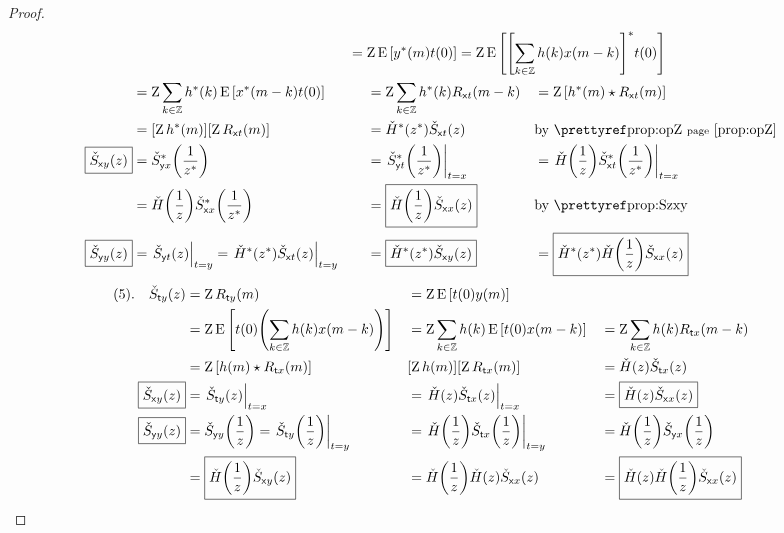 \begin{proof}
\begin{align*}
     &&\eqd\mathrlap{\opZ\pE\brs{\rvy^\ast(m)\rvt(0)}
       =    \opZ\pE\brs{\brs{\sum_{k\in\Z} \fh(k)\rvx(m-k)}^\ast \rvt(0)}}
    \\&=    \opZ\sum_{k\in\Z} \fh^\ast(k)\pE\brs{\rvx^\ast(m-k) \rvt(0)}
     &&=    \opZ\sum_{k\in\Z} \fh^\ast(k)\Rxt(m-k)
     &&\eqd \opZ\brs{\fh^\ast(m)\convd\Rxt(m)}
    \\&=    \brs{\opZ\fh^\ast(m)} \brs{\opZ\Rxt(m)}
     &&=    \ZH^\ast\brp{z^\ast}\Szxt(z)
     && \text{by \prefp{prop:opZ}}
    \\
    \boxed{\Szxy(z)}
      &= \Szyx^\ast\brp{\frac{1}{z^\ast}}
     &&\eqd \brlr{\Szyt^\ast\brp{\frac{1}{z^\ast}}}_{\rvt=\rvx}
     &&=  \brlr{\ZH\brp{\frac{1}{z}} \Szxt^\ast\brp{\frac{1}{z^\ast}}}_{\rvt=\rvx}
   \\&\eqd \ZH\brp{\frac{1}{z}} \Szxx^\ast\brp{\frac{1}{z^\ast}}
     &&=  \boxed{\ZH\brp{\frac{1}{z}} \Szxx(z)}
     &&   \text{by \pref{prop:Szxy}}
    \\
    \boxed{\Szyy(z)}
      &\eqd \brlr{\Szyt(z)}_{\rvt=\rvy}
       = \brlr{\ZH^\ast\brp{z^\ast}\Szxt(z)}_{\rvt=\rvy}
     &&= \boxed{\ZH^\ast\brp{z^\ast}\Szxy(z)}
     &&= \boxed{\ZH^\ast\brp{z^\ast}\ZH\brp{\frac{1}{z}} \Szxx(z)}
\end{align*}
\begin{align*}
    (5).\quad\Szty(z)
      &\eqd \opZ\Rty(m)
     &&\eqd \opZ\pE\brs{\rvt(0)\rvy(m)}
    \\&=    \opZ\pE\brs{\rvt(0)\brp{\sum_{k\in\Z} \fh(k) \rvx(m-k)}}
     &&=    \opZ                    \sum_{k\in\Z} \fh(k) \pE\brs{\rvt(0)\rvx(m-k)}
     &&\eqd \opZ                    \sum_{k\in\Z} \fh(k) \Rtx(m-k)
    \\&\eqd \opZ\brs{\fh(m) \convd \Rtx(m)}
      &&  \brs{\opZ\fh(m)} \brs{\opZ\Rtx(m)}
      &&= \ZH(z) \Sztx(z)
    \\
    \boxed{\Szxy(z)}
      &\eqd \brlr{\Szty(z)}_{\rvt=\rvx}
     &&= \brlr{\ZH(z) \Sztx(z)}_{\rvt=\rvx}
     &&= \boxed{\ZH(z) \Szxx(z)}
    \\
    \boxed{\Szyy(z)}
      &= \Szyy\brp{\frac{1}{z}}
       \eqd \brlr{\Szty\brp{\frac{1}{z}}}_{\rvt=\rvy}
     &&= \brlr{\ZH\brp{\frac{1}{z}} \Sztx\brp{\frac{1}{z}}}_{\rvt=\rvy}
     &&= \ZH\brp{\frac{1}{z}} \Szyx\brp{\frac{1}{z}}
    \\&= \boxed{\ZH\brp{\frac{1}{z}} \Szxy(z)}
     &&= \ZH\brp{\frac{1}{z}} \ZH(z) \Szxx(z)
     &&= \boxed{ \ZH(z) \ZH\brp{\frac{1}{z}} \Szxx(z)}

\end{align*}
\end{proof}
